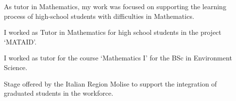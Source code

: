 \documentclass[letterpaper]{deedy-resume} %
\begin{document}
\begin{minipage}[t]{0.66\textwidth}
\sectionspace %



\begin{tightitemize}
\item As tutor in Mathematics, my work was focused on supporting the learning process of high-school students with difficulties in Mathematics. 
\end{tightitemize}

\sectionspace
{}
\begin{tightitemize}
\item I worked as Tutor in Mathematics for high school students in the project `MATAID'. 
\end{tightitemize}
\sectionspace


\begin{tightitemize}
\item I worked as tutor for the course `Mathematics I' for the BSc in Environment Science. 
\end{tightitemize}

\sectionspace


\begin{tightitemize}
\item Stage offered by the Italian Region Molise to support the integration of graduated students in the workforce. 
\end{tightitemize}

\sectionspace %



\end{minipage}
\end{document}
